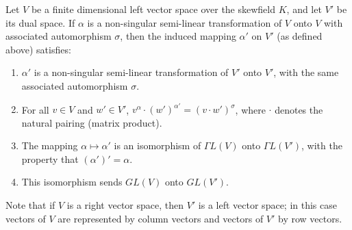 Let $V$ be a finite dimensional left vector space over the skewfield $K$, and let $V'$ be its dual space. If $\alpha$ is a non-singular semi-linear transformation of $V$ onto $V$ with associated automorphism $\sigma$, then the induced mapping $\alpha'$ on $V'$ (as defined above) satisfies:

\begin{enumerate}
\item[(i)] $\alpha'$ is a non-singular semi-linear transformation of $V'$ onto $V'$, with the same associated automorphism $\sigma$.
\item[(ii)] For all $v \in V$ and $w' \in V'$, $v^\alpha \cdot (w')^{\alpha'} = (v \cdot w')^\sigma$, where $\cdot$ denotes the natural pairing (matrix product).
\item[(iii)] The mapping $\alpha \mapsto \alpha'$ is an isomorphism of $\Gamma L(V)$ onto $\Gamma L(V')$, with the property that $(\alpha')' = \alpha$.
\item[(iv)] This isomorphism sends $GL(V)$ onto $GL(V')$.
\end{enumerate}

Note that if $V$ is a right vector space, then $V'$ is a left vector space; in this case vectors of $V$ are represented by column vectors and vectors of $V'$ by row vectors.
